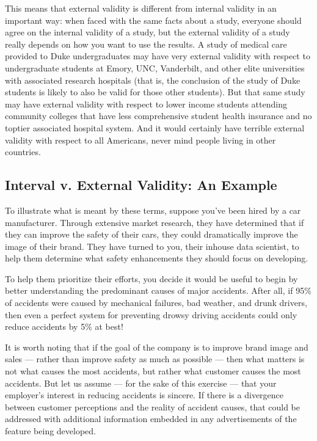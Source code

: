 \documentclass[letterpaper,10pt,english]{jupyterBook}
\begin{document}
\sphinxAtStartPar
This means that external validity is different from internal validity in an important way: when faced with the same facts about a study, everyone should  agree on the internal validity of a study, but the external validity of a study really depends on how you want to use the results. A study of medical care provided to Duke undergraduates may have very  external validity with respect to undergraduate students at Emory, UNC, Vanderbilt, and other elite universities with associated research hospitals (that is, the conclusion of the study of Duke students is likely to also be valid for those other students). But that same study may have  external validity with respect to lower income students attending community colleges that have less comprehensive student health insurance and no top\sphinxhyphen{}tier associated hospital system. And it would certainly have terrible external validity with respect to all Americans, never mind people living in other countries.


\subsection{Interval v. External Validity: An Example}
\label{\detokenize{30_questions/17_exploratory_questions_internal_external:interval-v-external-validity-an-example}}
\sphinxAtStartPar
To illustrate what is meant by these terms, suppose you’ve been hired by a car manufacturer. Through extensive market research, they have determined that if they can improve the safety of their cars, they could dramatically improve the image of their brand. They have turned to you, their in\sphinxhyphen{}house data scientist, to help them determine what safety enhancements they should focus on developing.

\sphinxAtStartPar
To help them prioritize their efforts, you decide it would be useful to begin by better understanding the predominant causes of major accidents. After all, if 95\% of accidents were caused by mechanical failures, bad weather, and drunk drivers, then even a perfect system for preventing drowsy driving accidents could only reduce accidents by 5\% at best!%
\begin{footnote}[1]\sphinxAtStartFootnote
It is worth noting that if the goal of the company is to improve brand image and sales — rather than improve safety as much as possible — then what matters is not what  causes the most accidents, but rather what customer  causes the most accidents. But let us assume — for the sake of this exercise — that your employer’s interest in reducing accidents is sincere. If there is a divergence between customer perceptions and the reality of accident causes, that could be addressed with additional information embedded in any advertisements of the feature being developed.
%
\end{footnote}
\end{document}
